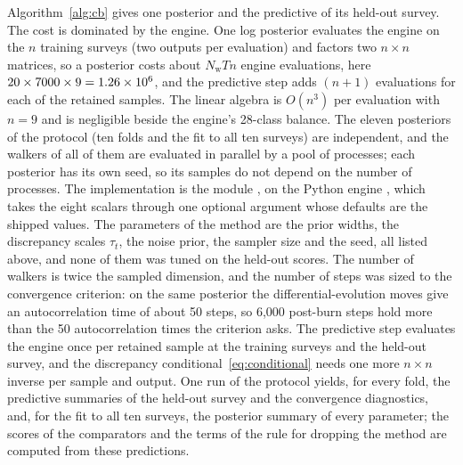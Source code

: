 \documentclass[journal]{IEEEtran}
\begin{document}
Algorithm~\ref{alg:cb} gives one posterior and the predictive of its held-out survey. The cost is dominated by the engine.
One log posterior evaluates the engine on the $n$ training surveys (two outputs per evaluation) and factors two $n\times n$
matrices, so a posterior costs about $N_{\mathrm w} T n$ engine evaluations, here $20\times7000\times9=1.26\times10^{6}$, and the
predictive step adds $(n+1)$ evaluations for each of the \nSamples{} retained samples. The linear algebra is
$O(n^3)$ per evaluation with $n=9$ and is negligible beside the engine's 28-class balance. The eleven posteriors of the
protocol (ten folds and the fit to all ten surveys) are independent, and the walkers of all of them are evaluated in
parallel by a pool of processes; each posterior has its own seed, so its samples do not depend on the number of
processes. The implementation is the module , on the Python engine
, which takes the eight scalars through one optional argument whose defaults
are the shipped values. The parameters of the method are the prior widths, the discrepancy scales $\tau_t$, the noise
prior, the sampler size and the seed, all listed above, and none of them was tuned on the held-out scores. The number of
walkers is twice the sampled dimension, and the number of steps was sized to the convergence criterion: on the same posterior the
differential-evolution moves give an autocorrelation time of about 50 steps, so 6,000 post-burn steps hold more than the 50
autocorrelation times the criterion asks. The predictive step evaluates the engine once per retained sample at the training
surveys and the held-out survey, and the discrepancy conditional~\eqref{eq:conditional} needs one more $n\times n$ inverse
per sample and output. One run of the protocol yields, for every fold, the predictive summaries of the held-out survey
and the convergence diagnostics, and, for the fit to all ten surveys, the posterior summary of every parameter; the scores
of the comparators and the terms of the rule for dropping the method are computed from these predictions.
\end{document}
